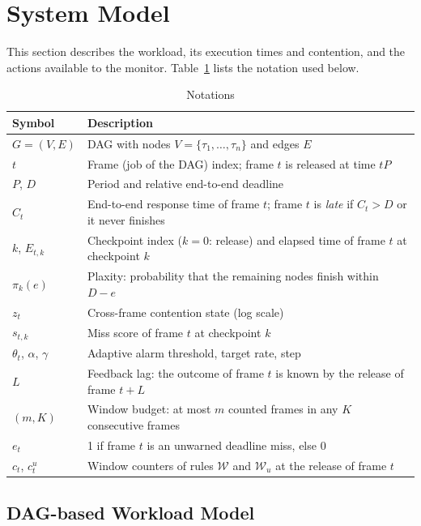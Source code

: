 \documentclass[acmsmall,screen]{acmart}
\newcommand{\Wu}{$\mathcal{W}_u$}
\newcommand{\Wl}{$\mathcal{W}$}
\begin{document}
\section{System Model}\label{sec:model}

This section describes the workload, its execution times and contention, and the actions available to the monitor. Table~\ref{tab:notation} lists the notation used below.

\begin{table}[t]
\caption{Notations}
\label{tab:notation}
\footnotesize
\begin{tabular}{@{}ll@{}}
\toprule
Symbol & Description \\
\midrule
$G=(V,E)$ & DAG with nodes $V=\{\tau_1,\dots,\tau_n\}$ and edges $E$ \\
$t$ & Frame (job of the DAG) index; frame $t$ is released at time $tP$ \\
$P$, $D$ & Period and relative end-to-end deadline \\
$C_t$ & End-to-end response time of frame $t$; frame $t$ is \emph{late} if $C_t>D$ or it never finishes \\
$k$, $E_{t,k}$ & Checkpoint index ($k=0$: release) and elapsed time of frame $t$ at checkpoint $k$ \\
$\pi_k(e)$ & Plaxity: probability that the remaining nodes finish within $D-e$ \\
$z_t$ & Cross-frame contention state (log scale) \\
$s_{t,k}$ & Miss score of frame $t$ at checkpoint $k$ \\
$\theta_t$, $\alpha$, $\gamma$ & Adaptive alarm threshold, target rate, step \\
$L$ & Feedback lag: the outcome of frame $t$ is known by the release of frame $t+L$ \\
$(m,K)$ & Window budget: at most $m$ counted frames in any $K$ consecutive frames \\
$e_t$ & 1 if frame $t$ is an unwarned deadline miss, else 0 \\
$c_t$, $c^u_t$ & Window counters of rules \Wl{} and \Wu{} at the release of frame $t$ \\
\bottomrule
\end{tabular}
\end{table}

\subsection{DAG-based Workload Model}
\end{document}

